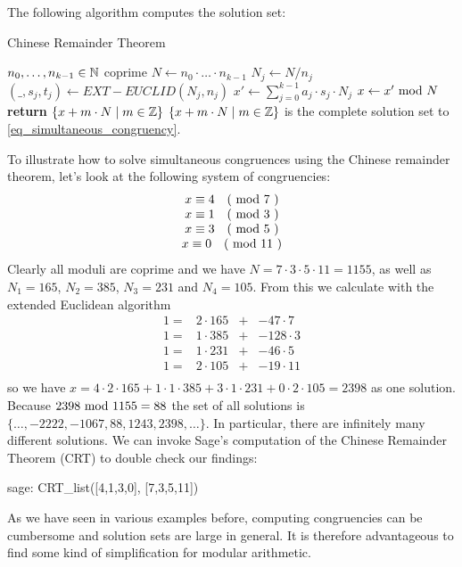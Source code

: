 The following algorithm computes the solution set: 
\begin{algorithm}\caption{Chinese Remainder Theorem}
\label{alg_chinese_remainder_theorem}
\begin{algorithmic}[0]
\Require $n_0,\ldots,n_{k-1} \in \mathbb{N}$ coprime
\State $N\gets n_0\cdot \ldots \cdot n_{k-1}$
\State $N_j\gets N/n_j$
\State $(\_,s_j,t_j)\gets EXT-EUCLID (N_j,n_j)$ 
\EndWhile
\State $x'\gets \sum_{j=0}^{k-1}a_j\cdot s_j\cdot N_j$
\State $x\gets x' \text{ mod } N$
\State \textbf{return} $\{x+ m\cdot N\;|\; m\in \mathbb{Z}\}$
\EndProcedure
\Ensure $\{x+ m\cdot N\;|\; m\in \mathbb{Z}\}$ is the complete solution set to \ref{eq_simultaneous_congruency}.
\end{algorithmic}
\end{algorithm}


\begin{example} To illustrate how to solve simultaneous congruences using the Chinese remainder theorem, let's look at the following system of congruencies:
$$
\begin{array}{c}
x \equiv 4 \quad \text{( mod } 7 \text{ )} \\
x \equiv 1 \quad \text{( mod } 3 \text{ )} \\
x \equiv 3 \quad \text{( mod } 5 \text{ )} \\
x \equiv 0 \quad \text{( mod } 11 \text{ )} \\
\end{array}
$$
Clearly all moduli are coprime and we have $ N = 7 \cdot 3 \cdot 5 \cdot 11 = 1155 $, as well as
$ N_1 = 165 $, $ N_2 = 385 $, $ N_3 = 231 $ and $ N_4 = 105 $. From this we calculate with the extended Euclidean algorithm
$$
\begin{array}{cccc}
 1 = & 2 \cdot 165  & + & -47 \cdot 7 \\
 1 = & 1 \cdot 385  & + &  -128 \cdot 3 \\
 1 = & 1 \cdot 231  & + &  -46 \cdot 5 \\
 1 = & 2 \cdot 105  & + &  -19 \cdot 11 \\
\end{array}
$$
so we have
$x = 4 \cdot 2 \cdot 165 + 1 \cdot 1 \cdot 385 + 3 \cdot 1 \cdot 231 + 0 \cdot 2 \cdot 105 = 2398$
as one solution. Because $ 2398 \text{ mod } 1155 = 88 $ the set of all solutions is
$ \{\ldots, -2222, -1067,88,1243, 2398, \ldots \} $. In particular, there are infinitely many different solutions. We can invoke Sage's computation of the Chinese Remainder Theorem (CRT) to double check our findings:
\begin{sagecommandline}
sage: CRT_list([4,1,3,0], [7,3,5,11])
\end{sagecommandline}
\end{example}
As we have seen in various examples before, computing congruencies can be cumbersome and solution sets are large in general. It is therefore advantageous to find some kind of simplification for modular arithmetic. 

